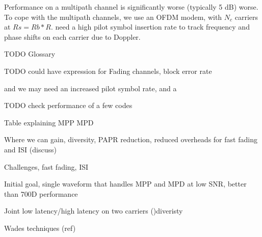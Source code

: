 \documentclass{article}
\begin{document}
Performance on a multipath channel is significantly worse (typically 5 dB) worse.  To cope with the multipath channels, we use an OFDM modem, with $N_c$ carriers at $Rs=Rb*R$. need a high pilot symbol insertion rate to track frequency and phase shifts on each carrier due to Doppler.

TODO Glossary

TODO could have expression for Fading channels, block error rate

 and we may need an increased pilot symbol rate, and a 

TODO check performance of a few codes

Table explaining MPP MPD



Where we can gain, diversity, PAPR reduction, reduced overheads for fast fading and ISI (discuss)

Challenges, fast fading, ISI

Initial goal, single waveform that handles MPP and MPD at low SNR, better than 700D performance

Joint low latency/high latency on two carriers ()diveristy

Wades techniques (ref)



\end{document}
